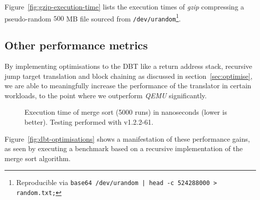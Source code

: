 Figure~\vref{fig:gzip-execution-time} lists the execution times of \textit{gzip} compressing a pseudo-random $500$ MB file sourced from \texttt{/dev/urandom}\footnote{Reproducible via \texttt{base64 /dev/urandom | head -c 524288000 > random.txt;}}.

\subsection{Other performance metrics}
By implementing optimisations to the DBT like a return address stack, recursive jump target translation and block chaining as discussed in section~\vref{sec:optimise}, we are able to meaningfully increase the performance of the translator in certain workloads, to the point where we outperform \textit{QEMU} significantly.

\begin{figure}[h]
	\centering
	\caption[Execution time of merge sort (5000 runs)]%
	{Execution time of merge sort (5000 runs) in nanoseconds (lower is better). Testing performed with v1.2.2-61.}
	\label{fig:dbt-optimisations}
\end{figure}

Figure~\vref{fig:dbt-optimisations} shows a manifestation of these performance gains, as seen by executing a benchmark based on a recursive implementation of the merge sort algorithm.






















